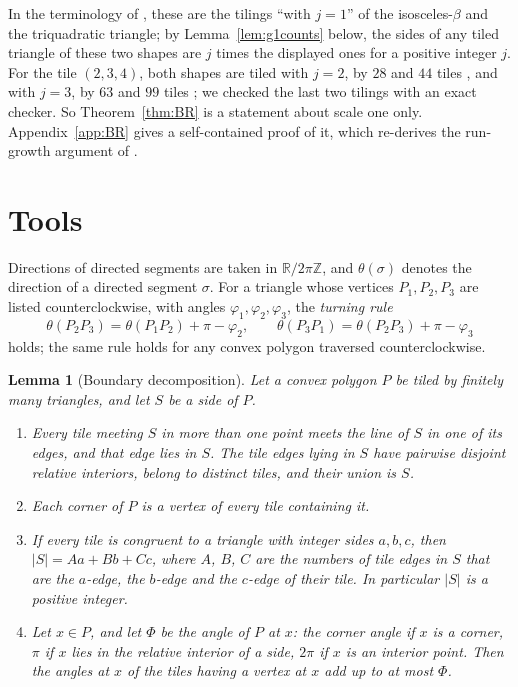 \documentclass[11pt]{amsart}
\newtheorem{lemma}[theorem]{Lemma}
\theoremstyle{remark}
\newcommand{\Z}{\mathbb{Z}}
\newcommand{\R}{\mathbb{R}}
\begin{document}
In the terminology of \cite{BR}, these are the tilings ``with $j=1$'' of the isosceles-$\beta$ and the triquadratic triangle; by Lemma~\ref{lem:g1counts} below, the sides of any tiled triangle of these two shapes are $j$ times the displayed ones for a positive integer $j$. For the tile $(2,3,4)$, both shapes are tiled with $j=2$, by $28$ and $44$ tiles \cite{Beeson2229}, and with $j=3$, by $63$ and $99$ tiles \cite{Bonfioli2}; we checked the last two tilings with an exact checker. So Theorem~\ref{thm:BR} is a statement about scale one only. Appendix~\ref{app:BR} gives a self-contained proof of it, which re-derives the run-growth argument of \cite{BR}.

\section{Tools}\label{sec:tools}

Directions of directed segments are taken in $\R/2\pi\Z$, and $\theta(\sigma)$ denotes the direction of a directed segment $\sigma$. For a triangle whose vertices $P_1,P_2,P_3$ are listed counterclockwise, with angles $\varphi_1,\varphi_2,\varphi_3$, the \emph{turning rule}
\begin{equation}\label{eq:turning}
\theta(P_2P_3)=\theta(P_1P_2)+\pi-\varphi_2,\qquad
\theta(P_3P_1)=\theta(P_2P_3)+\pi-\varphi_3
\end{equation}
holds; the same rule holds for any convex polygon traversed counterclockwise.

\begin{lemma}[Boundary decomposition]\label{lem:bdry}
Let a convex polygon $P$ be tiled by finitely many triangles, and let $S$ be a side of $P$.
\begin{enumerate}
\item[(a)] Every tile meeting $S$ in more than one point meets the line of $S$ in one of its edges, and that edge lies in $S$. The tile edges lying in $S$ have pairwise disjoint relative interiors, belong to distinct tiles, and their union is $S$.
\item[(b)] Each corner of $P$ is a vertex of every tile containing it.
\item[(c)] If every tile is congruent to a triangle with integer sides $a,b,c$, then $|S|=Aa+Bb+Cc$, where $A$, $B$, $C$ are the numbers of tile edges in $S$ that are the $a$-edge, the $b$-edge and the $c$-edge of their tile. In particular $|S|$ is a positive integer.
\item[(d)] Let $x\in P$, and let $\Phi$ be the angle of $P$ at $x$: the corner angle if $x$ is a corner, $\pi$ if $x$ lies in the relative interior of a side, $2\pi$ if $x$ is an interior point. Then the angles at $x$ of the tiles having a vertex at $x$ add up to at most $\Phi$.
\end{enumerate}
\end{lemma}
\end{document}
